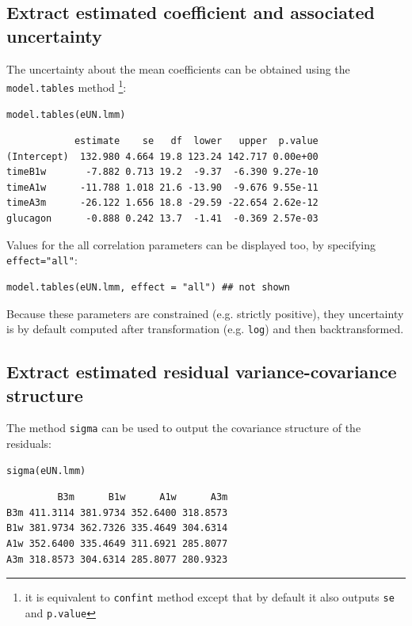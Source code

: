 \documentclass[12pt]{article}
\begin{document}
\subsection{Extract estimated coefficient and associated uncertainty}
\label{sec:orgdf4ba56}

The uncertainty about the mean coefficients can be obtained using the
\texttt{model.tables} method \footnote{it is equivalent to \texttt{confint} method
except that by default it also outputs \texttt{se} and \texttt{p.value}}:
\lstset{language=r,label= ,caption= ,captionpos=b,numbers=none}
\begin{lstlisting}
model.tables(eUN.lmm)
\end{lstlisting}

\begin{verbatim}
            estimate    se   df  lower   upper  p.value
(Intercept)  132.980 4.664 19.8 123.24 142.717 0.00e+00
timeB1w       -7.882 0.713 19.2  -9.37  -6.390 9.27e-10
timeA1w      -11.788 1.018 21.6 -13.90  -9.676 9.55e-11
timeA3m      -26.122 1.656 18.8 -29.59 -22.654 2.62e-12
glucagon      -0.888 0.242 13.7  -1.41  -0.369 2.57e-03
\end{verbatim}


Values for the all correlation parameters can be displayed
too, by specifying \texttt{effect="all"}:
\lstset{language=r,label= ,caption= ,captionpos=b,numbers=none}
\begin{lstlisting}
model.tables(eUN.lmm, effect = "all") ## not shown
\end{lstlisting}

Because these parameters are constrained (e.g. strictly positive),
they uncertainty is by default computed after transformation
(e.g. \texttt{log}) and then backtransformed. 

\subsection{Extract estimated residual variance-covariance structure}
\label{sec:orgf266558}

The method \texttt{sigma} can be used to output the covariance structure of the residuals:
\lstset{language=r,label= ,caption= ,captionpos=b,numbers=none}
\begin{lstlisting}
sigma(eUN.lmm)
\end{lstlisting}

\begin{verbatim}
         B3m      B1w      A1w      A3m
B3m 411.3114 381.9734 352.6400 318.8573
B1w 381.9734 362.7326 335.4649 304.6314
A1w 352.6400 335.4649 311.6921 285.8077
A3m 318.8573 304.6314 285.8077 280.9323
\end{verbatim}
\end{document}
